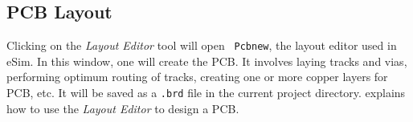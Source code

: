 \subsection {PCB Layout}
Clicking on the \textit{Layout Editor} tool will open {\tt
Pcbnew}, the layout editor used in eSim. In this
window, one will create the PCB. It involves laying tracks and vias,
performing optimum routing of tracks, creating one or more copper
layers for PCB, etc. It will be saved as a {\tt .brd} file in the 
current project directory.  explains how to use the 
\textit{Layout Editor} to design a PCB. 


%
